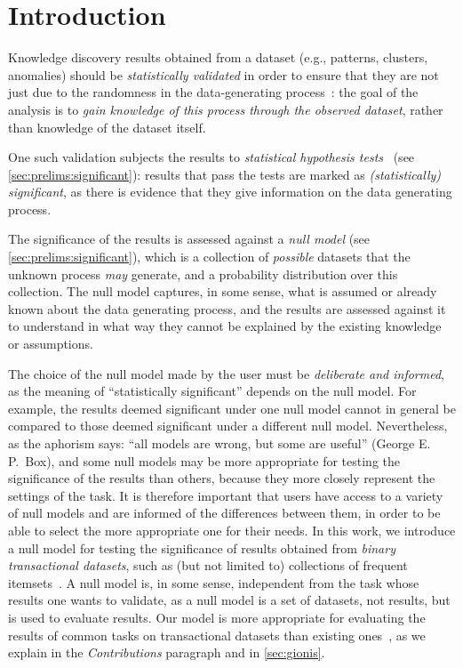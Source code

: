 \section{Introduction}\label{sec:intro}

Knowledge discovery results obtained from a dataset (e.g., patterns,
clusters, anomalies) should be \emph{statistically validated} in order to ensure
that they are not just due to the randomness in the data-generating
process~\citep{GionisMMT07,HamalainenW19,PellegrinaRV19b}: the goal of the
analysis is to \emph{gain knowledge of this process through the observed
dataset}, rather than knowledge of the dataset itself.

One such validation subjects the results to \emph{statistical hypothesis
tests}~\citep[Ch.\ 10]{Wasserman05} (see \cref{sec:prelims:significant}):
results that pass the tests are marked as \emph{(statistically) significant}, as
there is evidence that they give information on the data generating process.

The significance of the results is assessed against a \emph{null model} (see
\cref{sec:prelims:significant}), which is a collection of \emph{possible}
datasets that the unknown process \emph{may} generate, and a probability
distribution over this collection. The null model captures, in some sense, what
is assumed or already known about the data generating process, and the results
are assessed against it to understand in what way they cannot be explained by
the existing knowledge or assumptions.

The choice of the null model made by the user must be \emph{deliberate and informed},
as the meaning of ``statistically significant'' depends on the null model. For
example, the results deemed significant under one null model cannot in general
be compared to those deemed significant under a different null model.
Nevertheless, as the aphorism says: ``all models are wrong, but some are
useful'' (George E.\,P.\ Box), and some null models may be more appropriate for
testing the significance of the results than others, because they more closely
represent the settings of the task. It is therefore important that users have
access to a variety of null models and are informed of the differences between
them, in order to be able to select the more appropriate one for their needs. In
this work, we introduce a null model for testing the significance of results
obtained from \emph{binary transactional datasets}, such as (but not limited to)
collections of frequent itemsets~\citep{AgrawalS94}. A null model is, in some sense,
independent from the task whose results one wants to validate, as a null model
is a set of datasets, not results, but is used to evaluate results. Our model is
more appropriate for evaluating the results of common tasks on transactional
datasets than existing ones~\citep{GionisMMT07}, as we explain in the
\emph{Contributions} paragraph and in \cref{sec:gionis}.


